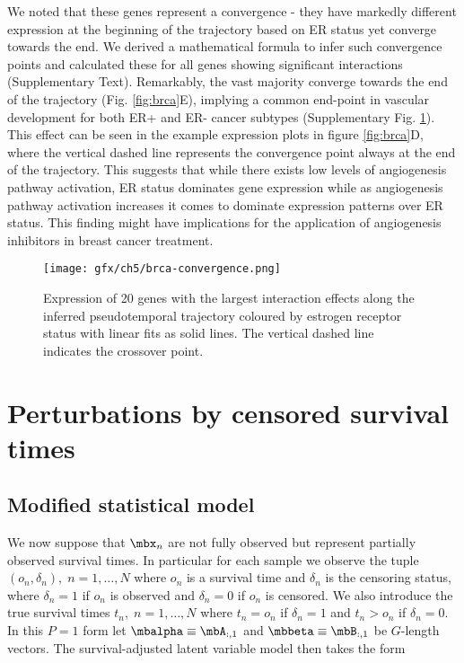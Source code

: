 We noted that these genes represent a convergence - they have markedly different expression at the beginning of the trajectory based on ER status yet converge towards the end. We derived a mathematical formula to infer such convergence points and calculated these for all genes showing significant interactions (Supplementary Text). Remarkably, the vast majority converge towards the end of the trajectory (Fig. \ref{fig:brca}E), implying a common end-point in vascular development for both ER+ and ER- cancer subtypes (Supplementary Fig. \ref{fig:brca_convergence}).
This effect can be seen in the example expression plots in figure \ref{fig:brca}D, where the vertical dashed line represents the convergence point always at the end of the trajectory.
This suggests that while there exists low levels of angiogenesis pathway activation, ER status dominates gene expression while as angiogenesis pathway activation increases it comes to dominate expression patterns over ER status. This finding might have implications for the application of angiogenesis inhibitors in breast cancer treatment.

\begin{figure}
   \texttt{[image: gfx/ch5/brca-convergence.png]}
   \caption{Expression of 20 genes with the largest interaction effects along the inferred pseudotemporal trajectory coloured by estrogen receptor status with linear fits as solid lines. The vertical dashed line indicates the crossover point.}
	\label{fig:brca_convergence}
\end{figure}


\section{Perturbations by censored survival times} \label{sec:survival}

\subsection{Modified statistical model}


We now suppose that $\mbx_n$ are not fully observed but represent partially observed survival times. In particular for each sample we observe the tuple $(o_n, \delta_n), \; n = 1, \ldots, N$ where $o_n$ is a survival time and $\delta_n$ is the censoring status, where $\delta_n = 1$ if $o_n$ is observed and $\delta_n = 0$ if $o_n$ is censored. We also introduce the true survival times $t_n, \; n = 1, \ldots, N$
where $t_n = o_n$ if $\delta_n = 1$ and $t_n > o_n$ if $\delta_n = 0$. In this $P = 1$ form let $\mbalpha \equiv \mbA_{:,1}$ and $\mbbeta \equiv \mbB_{:,1}$ be $G$-length vectors. The survival-adjusted latent variable model then takes the form

